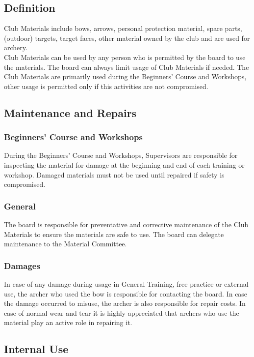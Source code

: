 \documentclass[a4paper]{article}
\begin{document}
\subsection{Definition}
Club Materials include bows, arrows, personal protection material, spare parts, (outdoor) targets, target faces, other material owned by the club and are used for archery. \\

Club Materials can be used by any person who is permitted by the board to use the materials. The board can always limit usage of Club Materials if needed. The Club Materials are primarily used during the Beginners' Course and Workshops, other usage is permitted only if this activities are not compromised.

\subsection{Maintenance and Repairs}
\subsubsection{Beginners' Course and Workshops}
During the Beginners' Course and Workshops, Supervisors are responsible for inspecting the material for damage at the beginning and end of each training or workshop. Damaged materials must not be used until repaired if safety is compromised.

\subsubsection{General}
The board is responsible for preventative and corrective maintenance of the Club Materials to ensure the materials are safe to use. The board can delegate maintenance to the Material Committee. 

\subsubsection{Damages}
In case of any damage during usage in General Training, free practice or external use, the archer who used the bow is responsible for contacting the board. In case the damage occurred to misuse, the archer is also responsible for repair costs. In case of normal wear and tear it is highly appreciated that archers who use the material play an active role in repairing it.

\subsection{Internal Use}
\end{document}
